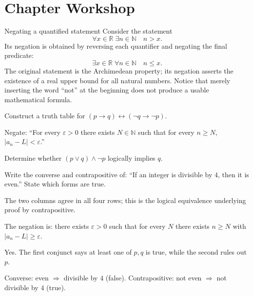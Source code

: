 \section{Chapter Workshop}

\begin{workedexample}{Negating a quantified statement}
Consider the statement
\[
    \forall x\in\mathbb{R}\;\exists n\in\mathbb{N}\quad n>x.
\]
Its negation is obtained by reversing each quantifier and negating the final predicate:
\[
    \exists x\in\mathbb{R}\;\forall n\in\mathbb{N}\quad n\le x.
\]
The original statement is the Archimedean property; its negation asserts the existence of a real upper bound for all natural numbers. Notice that merely inserting the word ``not'' at the beginning does not produce a usable mathematical formula.
\end{workedexample}

\begin{chapterexercises}
    \item Construct a truth table for $(p\to q)\leftrightarrow(\neg q\to\neg p)$.
    \item Negate: ``For every $\varepsilon>0$ there exists $N\in\mathbb{N}$ such that for every $n\ge N$, $|a_n-L|<\varepsilon$.''
    \item Determine whether $(p\lor q)\land\neg p$ logically implies $q$.
    \item Write the converse and contrapositive of: ``If an integer is divisible by $4$, then it is even.'' State which forms are true.
\end{chapterexercises}

\begin{selectedhints}
    \item The two columns agree in all four rows; this is the logical equivalence underlying proof by contrapositive.
    \item The negation is: there exists $\varepsilon>0$ such that for every $N$ there exists $n\ge N$ with $|a_n-L|\ge\varepsilon$.
    \item Yes. The first conjunct says at least one of $p,q$ is true, while the second rules out $p$.
    \item Converse: even $\Rightarrow$ divisible by $4$ (false). Contrapositive: not even $\Rightarrow$ not divisible by $4$ (true).
\end{selectedhints}
